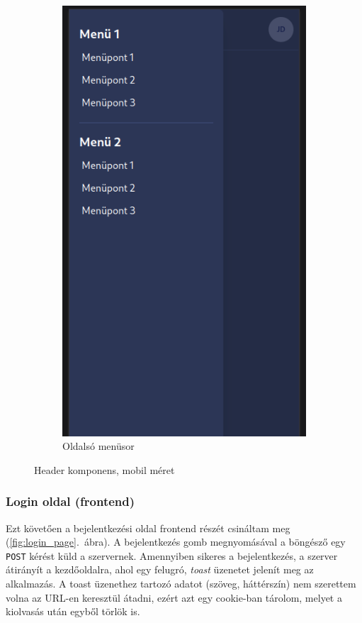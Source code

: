 \documentclass[a4paper]{article}
\newcommand{\inltxt}[1]{\texttt{#1}}
\begin{document}
\begin{figure}[ht]
\begin{subfigure}[b]{0.45\textwidth}
        \includegraphics[height=0.4\textheight]{images/header_mobile_open.png}
        \caption{Oldalsó menüsor}
        \label{fig:header_mobile_open}
    \end{subfigure}
    \caption{Header komponens, mobil méret}
    \label{fig:header_component_mobile}
\end{figure}

\subsubsection*{Login oldal (frontend)}
Ezt követően a bejelentkezési oldal frontend részét csináltam meg (\ref{fig:login_page}.~ábra).
A bejelentkezés gomb megnyomásával a böngésző egy \inltxt{POST} kérést küld a szervernek.
Amennyiben sikeres a bejelentkezés, a szerver átirányít a kezdőoldalra, ahol egy
felugró, \emph{toast} üzenetet jelenít meg az alkalmazás. A toast üzenethez tartozó adatot (szöveg, háttérszín) nem szerettem volna az
URL-en keresztül átadni, ezért azt egy cookie-ban tárolom, melyet a kiolvasás után egyből törlök is.
\end{document}
